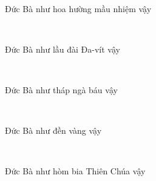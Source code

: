 \documentclass[12pt]{article}
\begin{document}
\begin{paracol}{2}
\begin{leftcolumn*}
\Large{\ \ \ }\\
\end{leftcolumn*}

\begin{rightcolumn}
Đức Bà như hoa hường mầu nhiệm vậy\\[1cm]
\end{rightcolumn}

\begin{leftcolumn*}
\Large{\ \ \ }\\
\end{leftcolumn*}

\begin{rightcolumn}
Đức Bà như lầu đài Đa-vít vậy\\
\end{rightcolumn}

\begin{leftcolumn*}
\Large{\ \ \ }\\
\end{leftcolumn*}

\begin{rightcolumn}
Đức Bà như tháp ngà báu vậy\\
\end{rightcolumn}

\begin{leftcolumn*}
\Large{\ \ \ }\\
\end{leftcolumn*}

\begin{rightcolumn}
Đức Bà như đền vàng vậy\\
\end{rightcolumn}

\begin{leftcolumn*}
\Large{\ \ \ }\\
\end{leftcolumn*}

\begin{rightcolumn}
Đức Bà như hòm bia Thiên Chúa vậy\\
\end{rightcolumn}

\begin{leftcolumn*}
\Large{\ \ \ }\\
\end{leftcolumn*}


\end{paracol}
\end{document}

